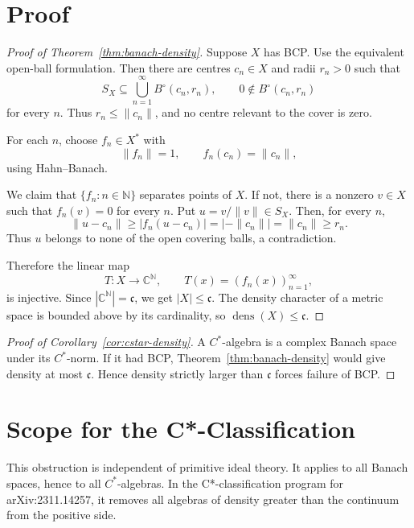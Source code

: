 \documentclass[11pt]{article}
\newcommand{\C}{\mathbb C}
\newcommand{\dens}{\operatorname{dens}}
\begin{document}
\section*{Proof}

\begin{proof}[Proof of Theorem~\ref{thm:banach-density}]
Suppose \(X\) has BCP.  Use the equivalent open-ball formulation.  Then there
are centres \(c_n\in X\) and radii \(r_n>0\) such that
\[
        S_X\subseteq \bigcup_{n=1}^{\infty}B^\circ(c_n,r_n),
        \qquad
        0\notin B^\circ(c_n,r_n)
\]
for every \(n\).  Thus \(r_n\le\|c_n\|\), and no centre relevant to the cover
is zero.

For each \(n\), choose \(f_n\in X^*\) with
\[
        \|f_n\|=1,\qquad f_n(c_n)=\|c_n\|,
\]
using Hahn--Banach.

We claim that \(\{f_n:n\in\mathbb N\}\) separates points of \(X\).  If not,
there is a nonzero \(v\in X\) such that \(f_n(v)=0\) for every \(n\).  Put
\(u=v/\|v\|\in S_X\).  Then, for every \(n\),
\[
        \|u-c_n\|
        \ge |f_n(u-c_n)|
        =
        |-\|c_n\||
        =
        \|c_n\|
        \ge
        r_n.
\]
Thus \(u\) belongs to none of the open covering balls, a contradiction.

Therefore the linear map
\[
        T:X\to\C^{\mathbb N},
        \qquad
        T(x)=(f_n(x))_{n=1}^{\infty},
\]
is injective.  Since \(|\C^{\mathbb N}|=\mathfrak c\), we get
\(|X|\le\mathfrak c\).  The density character of a metric space is bounded
above by its cardinality, so \(\dens(X)\le\mathfrak c\).
\end{proof}

\begin{proof}[Proof of Corollary~\ref{cor:cstar-density}]
A \(C^*\)-algebra is a complex Banach space under its \(C^*\)-norm.  If it had
BCP, Theorem~\ref{thm:banach-density} would give density at most
\(\mathfrak c\).  Hence density strictly larger than \(\mathfrak c\) forces
failure of BCP.
\end{proof}

\section*{Scope for the C*-Classification}

This obstruction is independent of primitive ideal theory.  It applies to all
Banach spaces, hence to all \(C^*\)-algebras.  In the C*-classification
program for arXiv:2311.14257, it removes all algebras of density greater than
the continuum from the positive side.
\end{document}

